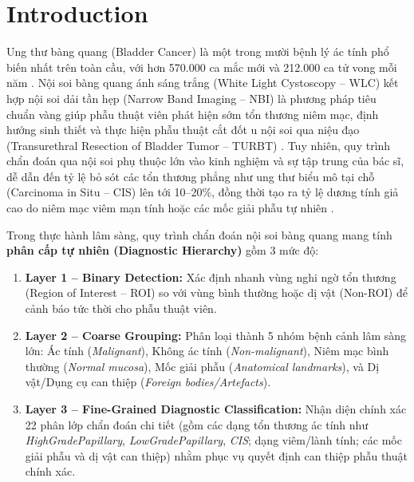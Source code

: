 \documentclass[runningheads]{llncs}
\begin{document}
\begin{abstract}
(Accuracy 0,8100 vs 0,7601). Bản đồ nhiệt Grad-CAM cải thiện độ trùng khớp IoU giải phẫu từ 0,0500 lên 0,2356 trên mặt nạ chuyên gia, đồng thời đạt thông lượng suy luận thời gian thực 66,7 FPS end-to-end trên phần cứng biên, chứng minh tính khả thi của phương pháp học phân cấp dài đuôi cho chẩn đoán nội soi bàng quang.

\end{abstract}
%
%
%
\section{Introduction}
\label{sec:intro}

Ung thư bàng quang (Bladder Cancer) là một trong mười bệnh lý ác tính phổ biến nhất trên toàn cầu, với hơn 570.000 ca mắc mới và 212.000 ca tử vong mỗi năm \cite{ref_lee2026cystods,ref_shkolyar2019augmented}. Nội soi bàng quang ánh sáng trắng (White Light Cystoscopy -- WLC) kết hợp nội soi dải tần hẹp (Narrow Band Imaging -- NBI) là phương pháp tiêu chuẩn vàng giúp phẫu thuật viên phát hiện sớm tổn thương niêm mạc, định hướng sinh thiết và thực hiện phẫu thuật cắt đốt u nội soi qua niệu đạo (Transurethral Resection of Bladder Tumor -- TURBT) \cite{ref_wu2022multicenter,ref_wang2026narrowband}. Tuy nhiên, quy trình chẩn đoán qua nội soi phụ thuộc lớn vào kinh nghiệm và sự tập trung của bác sĩ, dễ dẫn đến tỷ lệ bỏ sót các tổn thương phẳng như ung thư biểu mô tại chỗ (Carcinoma in Situ -- CIS) lên tới 10--20\%, đồng thời tạo ra tỷ lệ dương tính giả cao do niêm mạc viêm mạn tính hoặc các mốc giải phẫu tự nhiên \cite{ref_shkolyar2019augmented,ref_zhang2026multiarch}.

Trong thực hành lâm sàng, quy trình chẩn đoán nội soi bàng quang mang tính \textbf{phân cấp tự nhiên (Diagnostic Hierarchy)} gồm 3 mức độ:
\begin{enumerate}
    \item \textbf{Layer 1 -- Binary Detection:} Xác định nhanh vùng nghi ngờ tổn thương (Region of Interest -- ROI) so với vùng bình thường hoặc dị vật (Non-ROI) để cảnh báo tức thời cho phẫu thuật viên.
    \item \textbf{Layer 2 -- Coarse Grouping:} Phân loại thành 5 nhóm bệnh cảnh lâm sàng lớn: Ác tính (\textit{Malignant}), Không ác tính (\textit{Non-malignant}), Niêm mạc bình thường (\textit{Normal mucosa}), Mốc giải phẫu (\textit{Anatomical landmarks}), và Dị vật/Dụng cụ can thiệp (\textit{Foreign bodies/Artefacts}).
    \item \textbf{Layer 3 -- Fine-Grained Diagnostic Classification:} Nhận diện chính xác 22 phân lớp chẩn đoán chi tiết (gồm các dạng tổn thương ác tính như \textit{HighGradePapillary}, \textit{LowGradePapillary}, \textit{CIS}; dạng viêm/lành tính; các mốc giải phẫu và dị vật can thiệp) nhằm phục vụ quyết định can thiệp phẫu thuật chính xác.
\end{enumerate}
\end{document}
